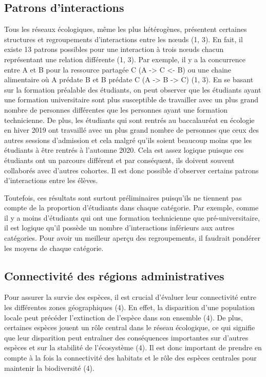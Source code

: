 \documentclass[9pt,twocolumn,twoside,]{pnas-new}
\begin{document}
\hypertarget{patrons-dinteractions}{%
\subsection{Patrons d'interactions}\label{patrons-dinteractions}}

Tous les réseaux écologiques, même les plus hétérogènes, présentent
certaines structures et regroupements d'interactions entre les nœuds (1,
3). En fait, il existe 13 patrons possibles pour une interaction à trois
nœuds chacun représentant une relation différente (1, 3). Par exemple,
il y a la concurrence entre A et B pour la ressource partagée C (A
-\textgreater{} C \textless- B) ou une chaine alimentaire où A prédate B
et B prédate C (A -\textgreater{} B -\textgreater{} C) (1, 3). En se
basant sur la formation préalable des étudiants, on peut observer que
les étudiants ayant une formation universitaire sont plus susceptible de
travailler avec un plus grand nombre de personnes différentes que les
personnes ayant une formation technicienne. De plus, les étudiants qui
sont rentrés au baccalauréat en écologie en hiver 2019 ont travaillé
avec un plus grand nombre de personnes que ceux des autres sessions
d'admission et cela malgré qu'ils soient beaucoup moins que les
étudiants à être rentrés à l'automne 2020. Cela est assez logique
puisque ces étudiants ont un parcours différent et par conséquent, ils
doivent souvent collaborés avec d'autres cohortes. Il est donc possible
d'observer certains patrons d'interactions entre les élèves.

Toutefois, ces résultats sont surtout préliminaires puisqu'ils ne
tiennent pas compte de la proportion d'étudiants dans chaque catégorie.
Par exemple, comme il y a moins d'étudiants qui ont une formation
technicienne que pré-universitaire, il est logique qu'il possède un
nombre d'interactions inférieurs aux autres catégories. Pour avoir un
meilleur aperçu des regroupements, il faudrait pondérer les moyens de
chaque catégorie.

\hypertarget{connectivituxe9-des-ruxe9gions-administratives}{%
\subsection{Connectivité des régions
administratives}\label{connectivituxe9-des-ruxe9gions-administratives}}

Pour assurer la survie des espèces, il est crucial d'évaluer leur
connectivité entre les différentes zones géographiques (4). En effet, la
disparition d'une population locale peut précéder l'extinction de
l'espèce dans son ensemble (4). De plus, certaines espèces jouent un
rôle central dans le réseau écologique, ce qui signifie que leur
disparition peut entraîner des conséquences importantes sur d'autres
espèces et sur la stabilité de l'écosystème (4). Il est donc important
de prendre en compte à la fois la connectivité des habitats et le rôle
des espèces centrales pour maintenir la biodiversité (4).
\end{document}
